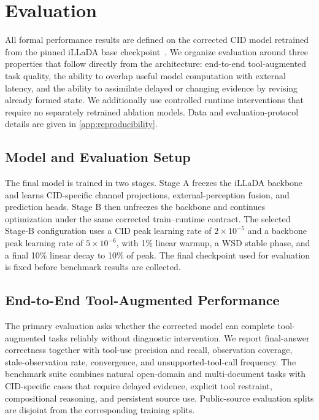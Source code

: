 \section{Evaluation}
\label{sec:experiments}

All formal performance results are defined on the corrected CID model retrained from the pinned iLLaDA base checkpoint~\citep{nie2026illada}. We organize evaluation around three properties that follow directly from the architecture: end-to-end tool-augmented task quality, the ability to overlap useful model computation with external latency, and the ability to assimilate delayed or changing evidence by revising already formed state. We additionally use controlled runtime interventions that require no separately retrained ablation models. Data and evaluation-protocol details are given in \cref{app:reproducibility}.

\subsection{Model and Evaluation Setup}
\label{sec:evaluation-setup}

The final model is trained in two stages. Stage A freezes the iLLaDA backbone and learns CID-specific channel projections, external-perception fusion, and prediction heads. Stage B then unfreezes the backbone and continues optimization under the same corrected train--runtime contract. The selected Stage-B configuration uses a CID peak learning rate of $2\times10^{-5}$ and a backbone peak learning rate of $5\times10^{-6}$, with 1\% linear warmup, a WSD stable phase, and a final 10\% linear decay to 10\% of peak. The final checkpoint used for evaluation is fixed before benchmark results are collected.

\subsection{End-to-End Tool-Augmented Performance}
\label{sec:end-to-end-evaluation}

The primary evaluation asks whether the corrected model can complete tool-augmented tasks reliably without diagnostic intervention. We report final-answer correctness together with tool-use precision and recall, observation coverage, stale-observation rate, convergence, and unsupported-tool-call frequency. The benchmark suite combines natural open-domain and multi-document tasks with CID-specific cases that require delayed evidence, explicit tool restraint, compositional reasoning, and persistent source use. Public-source evaluation splits are disjoint from the corresponding training splits.

